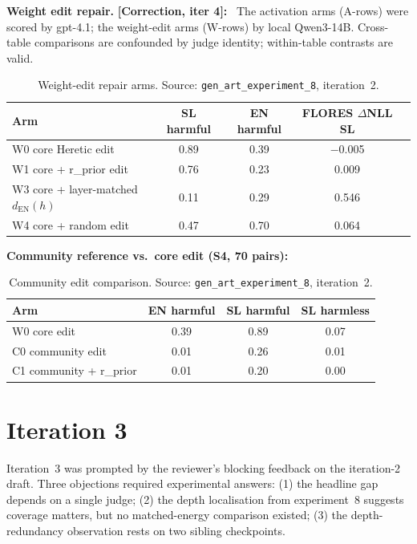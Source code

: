 \documentclass[11pt,letterpaper]{article}
\newcommand{\corr}[1]{\noindent\textbf{[Correction, iter #1]:}~}
\begin{document}
\textbf{Weight edit repair.} \corr{4} The activation arms (A-rows) were scored by gpt-4.1; the weight-edit arms (W-rows) by local Qwen3-14B. Cross-table comparisons are confounded by judge identity; within-table contrasts are valid.

\begin{table}[!htbp]
\centering
\caption{Weight-edit repair arms. Source: \texttt{gen\_art\_experiment\_8}, iteration~2.}
\label{tab:exp8_weight}
\small
\begin{tabular}{lcccc}
\toprule
Arm & SL harmful & EN harmful & FLORES $\Delta$NLL SL \\
\midrule
W0 core Heretic edit & 0.89 & 0.39 & $-$0.005 \\
W1 core + r\_prior edit & 0.76 & 0.23 & 0.009 \\
W3 core + layer-matched $d_\mathrm{EN}(h)$ & 0.11 & 0.29 & 0.546 \\
W4 core + random edit & 0.47 & 0.70 & 0.064 \\
\bottomrule
\end{tabular}
\end{table}

\textbf{Community reference vs.\ core edit (S4, 70 pairs):}

\begin{table}[!htbp]
\centering
\caption{Community edit comparison. Source: \texttt{gen\_art\_experiment\_8}, iteration~2.}
\label{tab:exp8_community}
\small
\begin{tabular}{lccc}
\toprule
Arm & EN harmful & SL harmful & SL harmless \\
\midrule
W0 core edit & 0.39 & 0.89 & 0.07 \\
C0 community edit & 0.01 & 0.26 & 0.01 \\
C1 community + r\_prior & 0.01 & 0.20 & 0.00 \\
\bottomrule
\end{tabular}
\end{table}


\section{Iteration 3}\label{sec:iter3}

Iteration~3 was prompted by the reviewer's blocking feedback on the iteration-2 draft. Three objections required experimental answers: (1) the headline gap depends on a single judge; (2) the depth localisation from experiment~8 suggests coverage matters, but no matched-energy comparison existed; (3) the depth-redundancy observation rests on two sibling checkpoints.
\end{document}

